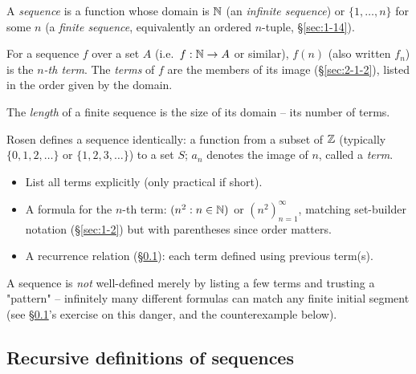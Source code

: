 \documentclass[11pt]{article}
\begin{document}
\begin{definition}[Sequence]
A \emph{sequence} is a function whose domain is $\mathbb{N}$ (an \emph{infinite sequence}) or $\{1,\dots,n\}$ for some $n$ (a \emph{finite sequence}, equivalently an ordered $n$-tuple, \S\ref{sec:1-14}).
\end{definition}

\begin{definition}
For a sequence $f$ over a set $A$ (i.e.\ $f:\mathbb{N}\to A$ or similar), $f(n)$ (also written $f_n$) is the \emph{$n$-th term}. The \emph{terms} of $f$ are the members of its image (\S\ref{sec:2-1-2}), listed in the order given by the domain.
\end{definition}

\begin{definition}[Length]
The \emph{length} of a finite sequence is the size of its domain -- its number of terms.
\end{definition}

\begin{note}
Rosen defines a sequence identically: a function from a subset of $\mathbb{Z}$ (typically $\{0,1,2,\dots\}$ or $\{1,2,3,\dots\}$) to a set $S$; $a_n$ denotes the image of $n$, called a \emph{term}.
\end{note}

\begin{note}
\begin{itemize}
    \item List all terms explicitly (only practical if short).
    \item A formula for the $n$-th term: $(n^2 : n\in\mathbb{N})$ or $(n^2)_{n=1}^{\infty}$, matching set-builder notation (\S\ref{sec:1-2}) but with parentheses since order matters.
    \item A recurrence relation (\S\ref{sec:6-2}): each term defined using previous term(s).
\end{itemize}
A sequence is \emph{not} well-defined merely by listing a few terms and trusting a "pattern" -- infinitely many different formulas can match any finite initial segment (see \S\ref{sec:6-2}'s exercise on this danger, and the counterexample below).
\end{note}

\subsection{Recursive definitions of sequences}
\label{sec:6-2}
\end{document}
